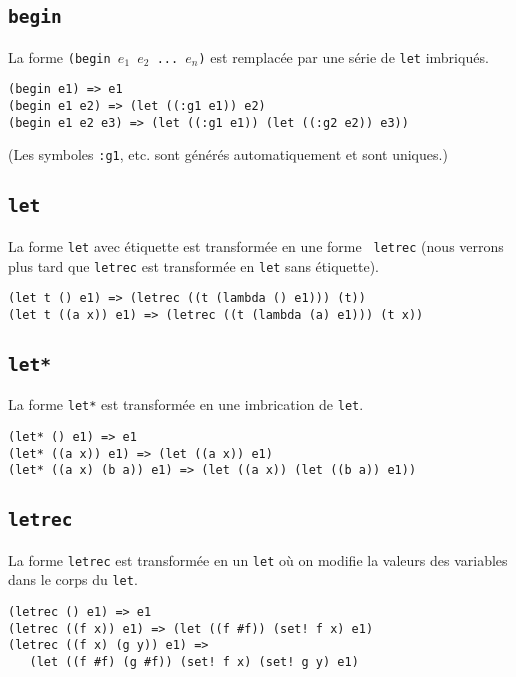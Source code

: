 \documentclass[10pt]{report}
\begin{document}
\subsection{\tt begin}

La forme {\tt (begin $e_1$ $e_2$ ... $e_n$)} est remplacée par une
série de {\tt let} imbriqués.


\begin{verbatim}
(begin e1) => e1
(begin e1 e2) => (let ((:g1 e1)) e2)
(begin e1 e2 e3) => (let ((:g1 e1)) (let ((:g2 e2)) e3))
\end{verbatim}

(Les symboles {\tt :g1}, etc. sont générés automatiquement et sont
uniques.)

\subsection{\tt let}

La forme {\tt let} avec étiquette est transformée en une forme {\tt
  letrec} (nous verrons plus tard que {\tt letrec} est transformée
en {\tt let} sans étiquette).

\begin{verbatim}
(let t () e1) => (letrec ((t (lambda () e1))) (t))
(let t ((a x)) e1) => (letrec ((t (lambda (a) e1))) (t x))
\end{verbatim}


\subsection{\tt let*}

La forme {\tt let*} est transformée en une imbrication de {\tt let}.

\begin{verbatim}
(let* () e1) => e1
(let* ((a x)) e1) => (let ((a x)) e1)
(let* ((a x) (b a)) e1) => (let ((a x)) (let ((b a)) e1))
\end{verbatim}


\subsection{\tt letrec}

La forme {\tt letrec} est transformée en un {\tt let} où on modifie la
valeurs des variables dans le corps du {\tt let}.

\begin{verbatim}
(letrec () e1) => e1
(letrec ((f x)) e1) => (let ((f #f)) (set! f x) e1)
(letrec ((f x) (g y)) e1) =>
   (let ((f #f) (g #f)) (set! f x) (set! g y) e1)
\end{verbatim}
\end{document}
